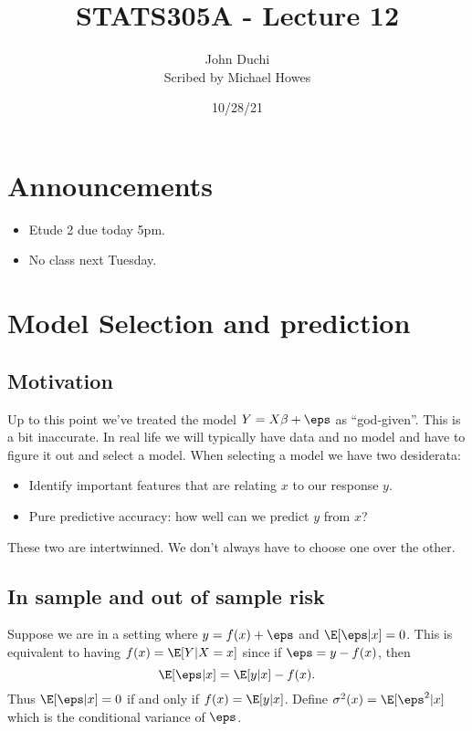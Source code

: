 



\title{STATS305A - Lecture 12}
\author{John Duchi\\ Scribed by Michael Howes}
\date{10/28/21}

\pagestyle{fancy}
\fancyhf{}


\maketitle
\tableofcontents
\section{Announcements}
\begin{itemize}
    \item Etude 2 due today 5pm.
    \item No class next Tuesday.
\end{itemize}
\section{Model Selection and prediction}
\subsection{Motivation}
Up to this point we've treated the model $Y=X\beta + \eps$ as ``god-given''. This is a bit inaccurate. In real life we will typically have data and no model and have to figure it out and select a model. When selecting a model we have two desiderata:
\begin{itemize}
    \item Identify important features that are relating $x$ to our response $y$.
    \item Pure predictive accuracy: how well can we predict $y$ from $x$?
\end{itemize}
These two are intertwinned. We don't always have to choose one over the other.
\subsection{In sample and out of sample risk}
Suppose we are in a setting where $y = f(x)+\eps$ and $\E[\eps|x]=0$. This is equivalent to having $f(x) = \E[Y|X=x]$ since if $\eps = y-f(x)$, then \[\E[\eps|x] = \E[y|x] - f(x).\]
Thus $\E[\eps|x]=0$ if and only if $f(x) = \E[y|x]$. Define $\sigma^2(x) = \E[\eps^2|x]$ which is the conditional variance of $\eps$. 

